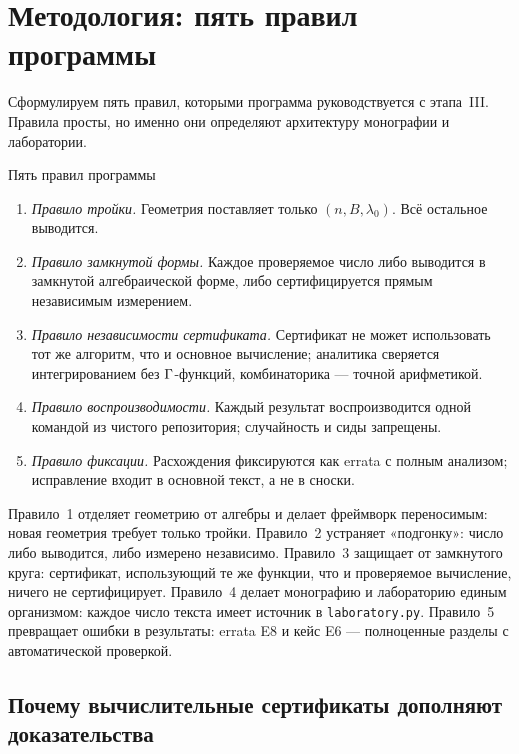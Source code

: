 \section{Методология: пять правил программы}\label{sec:rules}

Сформулируем пять правил, которыми программа руководствуется с
этапа~III. Правила просты, но именно они определяют архитектуру
монографии и лаборатории.

\begin{keybox}{Пять правил программы}
\begin{enumerate}[leftmargin=2em, itemsep=0.2em]
\item \emph{Правило тройки.} Геометрия поставляет только
  $(n,B,\lambda_0)$. Всё остальное выводится.
\item \emph{Правило замкнутой формы.} Каждое проверяемое число
  либо выводится в замкнутой алгебраической форме, либо
  сертифицируется прямым независимым измерением.
\item \emph{Правило независимости сертификата.} Сертификат не может
  использовать тот же алгоритм, что и основное вычисление; аналитика
  сверяется интегрированием без $\Gamma$-функций, комбинаторика ---
  точной арифметикой.
\item \emph{Правило воспроизводимости.} Каждый результат
  воспроизводится одной командой из чистого репозитория; случайность
  и сиды запрещены.
\item \emph{Правило фиксации.} Расхождения фиксируются как errata с
  полным анализом; исправление входит в основной текст, а не в
  сноски.
\end{enumerate}
\end{keybox}

Правило~1 отделяет геометрию от алгебры и делает фреймворк
переносимым: новая геометрия требует только тройки. Правило~2
устраняет «подгонку»: число либо выводится, либо измерено независимо.
Правило~3 защищает от замкнутого круга: сертификат, использующий те
же функции, что и проверяемое вычисление, ничего не сертифицирует.
Правило~4 делает монографию и лабораторию единым организмом: каждое
число текста имеет источник в \texttt{laboratory.py}. Правило~5
превращает ошибки в результаты: errata E8 и кейс E6 --- полноценные
разделы с автоматической проверкой.

\subsection{Почему вычислительные сертификаты дополняют доказательства}

